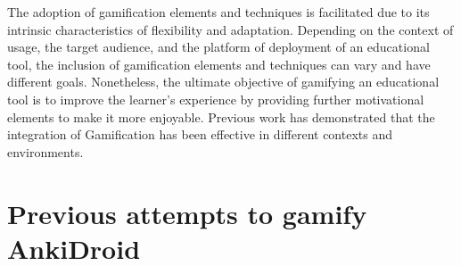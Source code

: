 The adoption of gamification elements and techniques is facilitated due to its intrinsic characteristics of flexibility and adaptation. Depending on the context of usage, the target audience, and the platform of deployment of an educational tool, the inclusion of gamification elements and techniques can vary and have different goals. Nonetheless, the ultimate objective of gamifying an educational tool is to improve the learner's experience by providing further motivational elements to make it more enjoyable. Previous work has demonstrated that the integration of Gamification has been effective in different contexts and environments.

\section{Previous attempts to gamify AnkiDroid}
